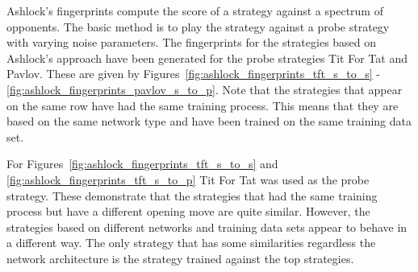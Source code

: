 Ashlock's fingerprints compute the score of a strategy against a spectrum of
opponents. The basic method is to play the strategy against a probe strategy
with varying noise parameters. The fingerprints for the \lstmstrategies strategies based on
Ashlock's approach have been generated for the probe strategies Tit For Tat and
Pavlov. These are given by Figures~\ref{fig:ashlock_fingerprints_tft_s_to_s} -
\ref{fig:ashlock_fingerprints_pavlov_s_to_p}. Note that the strategies that
appear on the same row have had the same training process. This means that they
are based on the same network type and have been trained on the same training
data set.

For Figures~\ref{fig:ashlock_fingerprints_tft_s_to_s} and
\ref{fig:ashlock_fingerprints_tft_s_to_p} Tit For Tat was used as the probe
strategy. These demonstrate that the strategies that had the same training
process but have a different opening move are quite similar. However, the
strategies based on different networks and training data sets appear to behave
in a different way. The only strategy that has some similarities regardless the
network architecture is the strategy trained against the top strategies.

